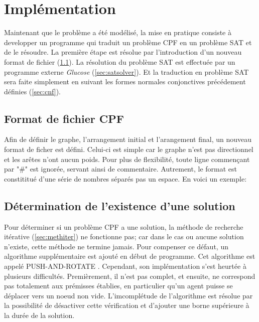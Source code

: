\documentclass[french, 12pt, letterpaper]{article}
\theoremstyle{definition}
\theoremstyle{proposition}
\theoremstyle{example}
\begin{document}
    \newpage
    \section{Implémentation}

    Maintenant que le problème a été modélisé, la mise en pratique consiste à developper un programme qui traduit un problème CPF en 
    un problème SAT et de le résoudre.
    La première étape est résolue par l'introduction d'un nouveau format de fichier (\ref{sec:filecpf}).
    La résolution du problème SAT est effectuée par un programme externe \emph{Glucose} (\ref{sec:satsolver}). 
    Et la traduction en problème SAT sera faite simplement en suivant les formes normales conjonctives précédement définies (\ref{sec:cnf}). 

    \subsection{Format de fichier CPF}
    \label{sec:filecpf}

    Afin de définir le graphe, l'arrangement initial et l'arangement final, un nouveau format de ficher est défini.
    Celui-ci est simple car le graphe n'est pas directionnel et les arêtes n'ont aucun poids.
    Pour plus de flexibilité, toute ligne commençant par "\#" est ignorée, servant ainsi de commentaire. 
    Autrement, le format est constititué d'une série de nombres séparés pas un espace. 
    En voici un exemple:
    
    
        
    \subsection{Détermination de l'existence d'une solution}
    \label{sec:par}

    Pour déterminer si un problème CPF a une solution, la méthode de recherche itérative (\ref{sec:methiter}) ne fonctionne pas;
    car dans le cas ou aucune solution n'existe, cette méthode ne termine jamais.
    Pour compenser ce défaut, un algorithme supplémentaire est ajouté en début de programme.
    Cet algorithme est appelé PUSH-AND-ROTATE \cite{WILDEPAR}. 
    Cependant, son implémentation s'est heurtée à plusieurs difficultés. 
    Premièrement, il n'est pas complet, et ensuite, ne correspond pas totalement aux prémisses établies, en particulier 
    qu'un agent puisse se déplacer vers un noeud non vide.
    L'imcomplétude de l'algorithme est résolue par la possibilité de désactiver cette vérification et d'ajouter une borne 
    supérieure à la durée de la solution.
\end{document}
